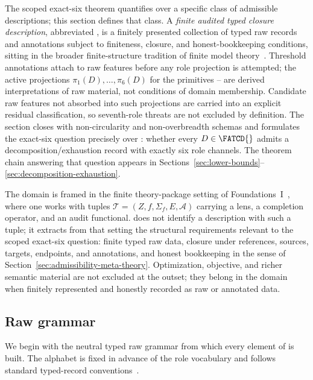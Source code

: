 The scoped exact-six theorem quantifies over a specific class of
admissible descriptions; this section defines that class. A
\emph{finite audited typed closure description}, abbreviated \FATCD{},
is a finitely presented collection of typed raw records and
annotations subject to finiteness, closure, and honest-bookkeeping
conditions, sitting in the broader finite-structure tradition of
finite model theory~\citep{Libkin2004}. Threshold annotations attach to raw features before any
role projection is attempted; the active projections
\(\pi_1(D),\dots,\pi_6(D)\) for the primitives \Pone{}--\Psix{} are
derived interpretations of raw material, not conditions of domain
membership. Candidate raw features not absorbed into such projections
are carried into an explicit residual classification, so seventh-role
threats are not excluded by definition. The section closes with
non-circularity and non-overbreadth schemas and formulates the
exact-six question precisely over \FATCD{}: whether every
\(D \in \FATCD{}\) admits a decomposition/exhaustion record with
exactly six role channels. The theorem chain answering that question
appears in
Sections~\ref{sec:lower-bounds}--\ref{sec:decomposition-exhaustion}.

The domain is framed in the finite theory-package setting of
Foundations~I~\citep{Tsiokos2026SixBirdsFoundations}, where one works
with tuples \(\mathcal{T} = (Z, f, \Sigma_f, E, \mathcal{A})\)
carrying a lens, a completion operator, and an audit functional. \FATCD{} does not
identify a description with such a tuple; it extracts from that
setting the structural requirements relevant to the scoped exact-six
question: finite typed raw data, closure under references, sources,
targets, endpoints, and annotations, and honest bookkeeping in the
sense of Section~\ref{sec:admissibility-meta-theory}. Optimization,
objective, and richer semantic material are not excluded at the
outset; they belong in the domain when finitely represented and
honestly recorded as raw or annotated data.

\subsection{Raw grammar}\label{subsec:raw-grammar}

We begin with the neutral typed raw grammar from which every element
of \FATCD{} is built. The alphabet is fixed in advance of the role
vocabulary and follows standard typed-record
conventions~\citep{CardelliMitchell1991}.


